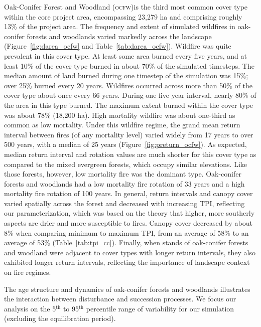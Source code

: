 Oak-Conifer Forest and Woodland (\textsc{ocfw})is the third most common cover type within the core project area, encompassing 23,279 ha and comprising roughly 13\% of the project area. The frequency and extent of simulated wildfires in oak-conifer forests and woodlands varied markedly across the landscape (Figure~\ref{fig:darea_ocfw} and Table~\ref{tab:darea_ocfw}).  %
%
Wildfire was quite prevalent in this cover type. At least some area burned every five years, and at least 10\% of the cover type burned in about 70\% of the simulated timesteps. The median amount of land burned during one timestep of the simulation was 15\%; over 25\% burned every 20 years. Wildfires occurred across more than 50\% of the cover type about once every 66 years. During one five year interval, nearly 80\% of the area in this type burned. The maximum extent burned within the cover type was about 78\% (18,200 ha). High mortality wildfire was about one-third as common as low mortality. %
%
Under this wildfire regime, the grand mean return interval between fires (of any mortality level) varied widely from 17 years to over 500 years, with a median of 25 years (Figure~\ref{fig:preturn_ocfw}). As expected, median return interval and rotation values are much shorter for this cover type as compared to the mixed evergreen forests, which occupy similar elevations. Like those forests, however, low mortality fire was the dominant type. Oak-conifer forests and woodlands had a low mortality fire rotation of 33 years and a high mortality fire rotation of 100 years. %
%
In general, return intervals and canopy cover varied spatially across the forest and decreased with increasing TPI, reflecting our parameterization, which was based on the theory that higher, more southerly aspects are drier and more susceptible to fires. Canopy cover decreased by about 8\% when comparing minimum to maximum TPI, from an average of 58\% to an average of 53\% (Table~\ref{tab:tpi_cc}). %
%
Finally, when stands of oak-conifer forests and woodland were adjacent to cover types with longer return intervals, they also exhibited longer return intervals, reflecting the importance of landscape context on fire regimes.

The age structure and dynamics of oak-conifer forests and woodlands illustrates the interaction between disturbance and succession processes. We focus our analysis on the 5$^{\text{th}}$ to 95$^{\text{th}}$ percentile range of variability for our simulation (excluding the equilibration period). %

